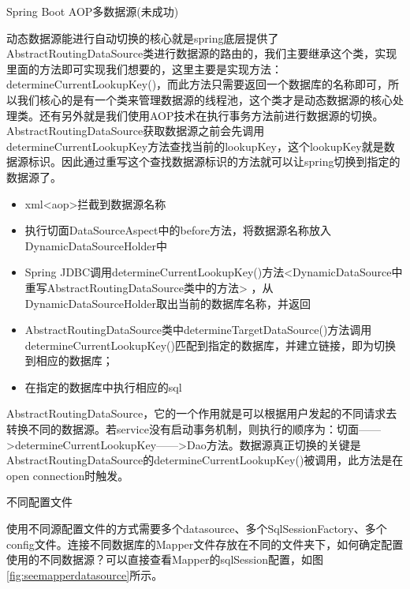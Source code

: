 \documentclass[12pt]{book}
\makeatletter
\numberwithin{dummy}{section}
\theoremstyle{ocrenumbox}
\theoremstyle{blacknumex}
\theoremstyle{blacknumbox}
\theoremstyle{ocrenum}
\renewcommand{\subsection}{\@startsection {subsection}{2}{\z@}
	{-3ex \@plus -0.1ex \@minus -.4ex}
	{0.5ex \@plus.2ex }
	{\normalfont\sffamily\bfseries}}
\renewcommand\paragraph{\@startsection{paragraph}{4}{\z@}
	{-2ex \@plus-.2ex \@minus .2ex}
	{.1ex}
	{\normalfont\small\sffamily\bfseries}}
\makeatother
\begin{document}
\paragraph{Spring Boot AOP多数据源(未成功)}

动态数据源能进行自动切换的核心就是spring底层提供了AbstractRoutingDataSource类进行数据源的路由的，我们主要继承这个类，实现里面的方法即可实现我们想要的，这里主要是实现方法：determineCurrentLookupKey()，而此方法只需要返回一个数据库的名称即可，所以我们核心的是有一个类来管理数据源的线程池，这个类才是动态数据源的核心处理类。还有另外就是我们使用AOP技术在执行事务方法前进行数据源的切换。AbstractRoutingDataSource获取数据源之前会先调用determineCurrentLookupKey方法查找当前的lookupKey，这个lookupKey就是数据源标识。因此通过重写这个查找数据源标识的方法就可以让spring切换到指定的数据源了。

\begin{itemize}
	\item {xml<aop>拦截到数据源名称}
	\item {执行切面DataSourceAspect中的before方法，将数据源名称放入 DynamicDataSourceHolder中}
	\item {Spring JDBC调用determineCurrentLookupKey()方法<DynamicDataSource中重写AbstractRoutingDataSource类中的方法> ，从DynamicDataSourceHolder取出当前的数据库名称，并返回}	
	\item {AbstractRoutingDataSource类中determineTargetDataSource()方法调用determineCurrentLookupKey()匹配到指定的数据库，并建立链接，即为切换到相应的数据库；}
	\item {在指定的数据库中执行相应的sql}
\end{itemize}

AbstractRoutingDataSource，它的一个作用就是可以根据用户发起的不同请求去转换不同的数据源。若service没有启动事务机制，则执行的顺序为：切面——>determineCurrentLookupKey——>Dao方法。数据源真正切换的关键是AbstractRoutingDataSource的determineCurrentLookupKey()被调用，此方法是在open connection时触发。

\subsection{不同配置文件}

使用不同源配置文件的方式需要多个datasource、多个SqlSessionFactory、多个config文件。连接不同数据库的Mapper文件存放在不同的文件夹下，如何确定配置使用的不同数据源？可以直接查看Mapper的sqlSession配置，如图\ref{fig:seemapperdatasource}所示。
\end{document}
